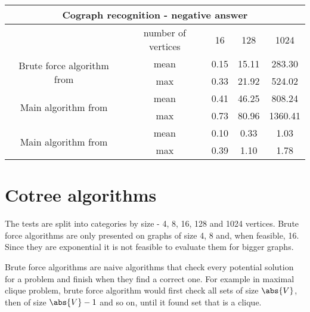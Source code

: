 \begin{center}

    \begin{tabular}{ |c|c|c|c|c|}
        \hline
        \multicolumn{5}{|c|}{Cograph recognition - negative answer}                                            \\
        \hline
                                                                 & number of vertices & 16   & 128   & 1024    \\
        \hline
        \multirow{2}{*}{Brute force algorithm from \cite{habib}} & mean               & 0.15 & 15.11 & 283.30  \\
                                                                 & max                & 0.33 & 21.92 & 524.02  \\
        \hline
        \multirow{2}{*}{Main algorithm from \cite{habib}}        & mean               & 0.41 & 46.25 & 808.24  \\
                                                                 & max                & 0.73 & 80.96 & 1360.41 \\
        \hline
        \multirow{2}{*}{Main algorithm from \cite{corneil}}      & mean               & 0.10 & 0.33  & 1.03    \\
                                                                 & max                & 0.39 & 1.10  & 1.78    \\

        \hline
    \end{tabular}
\end{center}

\section{Cotree algorithms}

The tests are split into categories by size - 4, 8, 16, 128 and 1024  vertices. Brute force algorithms are only presented on graphs of size 4, 8 and, when feasible, 16. Since they are exponential it is not feasible to evaluate them for bigger graphs.

Brute force algorithms are naive algorithms that check every potential solution for a problem and finish when they find a correct one. For example in maximal clique problem, brute force algorithm would first check all sets of size $\abs{V}$, then of size $\abs{V}-1$ and so on, until it found set that is a clique.

